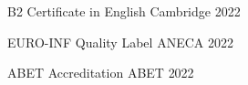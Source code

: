 

\begin{cvhonors}

    \cvhonor
    {B2 Certificate in English} %
    {Cambridge} %
    {} %
    {2022} %

\cvhonor
  {EURO-INF Quality Label} %
  {ANECA} %
  {} %
  {2022} %

\cvhonor
  {ABET Accreditation} %
  {ABET} %
  {} %
  {2022} %

\end{cvhonors}
